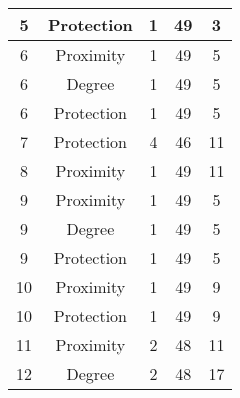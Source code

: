 \documentclass[results.tex]{subfiles}
\begin{document}
\begin{center}
\begin{tabular}{| c || c | c | c | c |}
            \hline
            5                       & Protection                   & 1                      & 49                      & 3                    \\
            \hline
            6                       & Proximity                    & 1                      & 49                      & 5                    \\
            \hline
            6                       & Degree                       & 1                      & 49                      & 5                    \\
            \hline
            6                       & Protection                   & 1                      & 49                      & 5                    \\
            \hline
            7                       & Protection                   & 4                      & 46                      & 11                   \\
            \hline
            8                       & Proximity                    & 1                      & 49                      & 11                   \\
            \hline
            9                       & Proximity                    & 1                      & 49                      & 5                    \\
            \hline
            9                       & Degree                       & 1                      & 49                      & 5                    \\
            \hline
            9                       & Protection                   & 1                      & 49                      & 5                    \\
            \hline
            10                      & Proximity                    & 1                      & 49                      & 9                    \\
            \hline
            10                      & Protection                   & 1                      & 49                      & 9                    \\
            \hline
            11                      & Proximity                    & 2                      & 48                      & 11                   \\
            \hline
            12                      & Degree                       & 2                      & 48                      & 17                   \\

\end{tabular}
\end{center}
\end{document}
